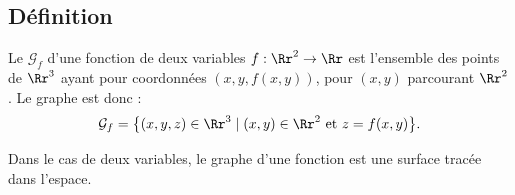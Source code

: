 \documentclass[11pt,class=report,crop=false]{standalone}
\begin{document}
\subsection{Définition}





\begin{definition}
Le  $\mathcal{G}_f$ d'une fonction de deux variables $f : \Rr^2 \to \Rr$ est  l'ensemble des points de $\Rr^3$ ayant pour coordonnées $(x,y,f(x,y))$, pour $(x,y)$ parcourant $\Rr^2$. Le graphe est donc :
$$\mathcal{G}_f= \big\{ (x,y,z) \in \Rr^3 \mid (x,y)\in \Rr^2 \text{ et } z=f(x,y)\big\}.$$
\end{definition}

Dans le cas de deux variables, le graphe d'une fonction est une surface tracée dans l'espace.


   
\end{document}
